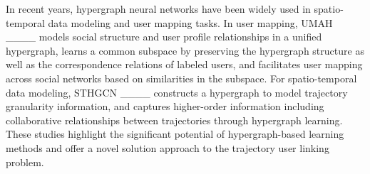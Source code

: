 In recent years, hypergraph neural networks have been widely used in spatio-temporal data modeling and user mapping tasks. In user mapping, UMAH ____ models social structure and user profile relationships in a unified hypergraph, learns a common subspace by preserving the hypergraph structure as well as the correspondence relations of labeled users, and facilitates user mapping across social networks based on similarities in the subspace. For spatio-temporal data modeling, STHGCN ____ constructs a hypergraph to model trajectory granularity information, and captures higher-order information including collaborative relationships between trajectories through hypergraph learning. These studies highlight the significant potential of hypergraph-based learning methods and offer a novel solution approach to the trajectory user linking problem.